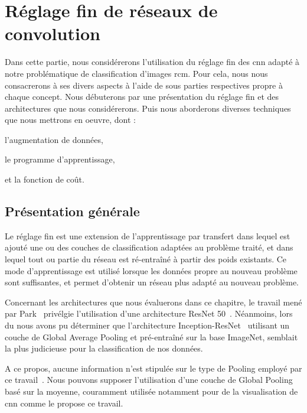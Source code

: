 \section{Réglage fin de réseaux de convolution}
Dans cette partie, nous considérerons l'utilisation du réglage fin des \gls{cnn} adapté à notre problématique de classification d'images \gls{rcm}. Pour cela, nous nous consacrerons à ses divers aspects à l'aide de sous parties respectives propre à chaque concept. Nous débuterons par une présentation du réglage fin et des architectures que nous considérerons. Puis nous aborderons diverses techniques que nous mettrons en oeuvre, dont :
\begin{inlinerate}
    \item l'augmentation de données,
    \item le programme d'apprentissage,
    \item et la fonction de coût.
\end{inlinerate}\par

\subsection{Présentation générale}
Le réglage fin est une extension de l'apprentissage par transfert dans lequel est ajouté une ou des couches de classification adaptées au problème traité, et dans lequel tout ou partie du réseau est ré-entraîné à partir des poids existants. Ce mode d'apprentissage est utilisé lorsque les données propre au nouveau problème sont suffisantes, et permet d'obtenir un réseau plus adapté au nouveau problème.\par

Concernant les architectures que nous évaluerons dans ce chapitre, le travail mené par Park~\cite{Park2019} privélgie l'utilisation d'une architecture ResNet 50~\cite{He2016}. Néanmoins, lors du  nous avons pu déterminer que l'architecture Inception-ResNet~\cite{Szegedy2017} utilisant un couche de Global Average Pooling et pré-entraîné sur la base ImageNet, semblait la plus judicieuse pour la classification de nos données.\par

A ce propos, aucune information n'est stipulée sur le type de Pooling employé par ce travail~\cite{Park2019}. Nous pouvons supposer l'utilisation d'une couche de Global Pooling basé sur la moyenne, couramment utilisée notamment pour de la visualisation de \gls{cnn} comme le propose ce travail.\par

